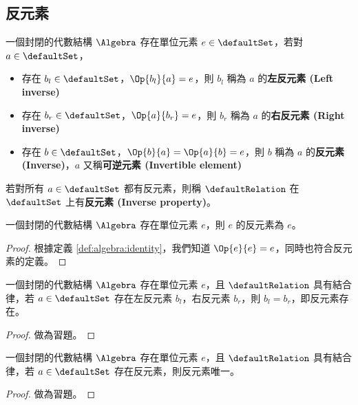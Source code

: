 \documentclass[12pt,a4paper,oneside]{report}
\begin{document}
\begin{CJK}{UTF8}{bkai}
\subsection{反元素}

\begin{mydef}[反元素]
\label{def:algebra:inverse}
一個封閉的代數結構 $\Algebra$ 存在單位元素 $e\in{\defaultSet}$，若對 $a\in{\defaultSet}$，
\begin{itemize}
\item 存在 $b_l\in{\defaultSet}$，$\Op{b_l}{a}=e$，則 $b_l$ 稱為 $a$ 的\textbf{左反元素 (Left inverse)}
\item 存在 $b_r\in{\defaultSet}$，$\Op{a}{b_r}=e$，則 $b_r$ 稱為 $a$ 的\textbf{右反元素 (Right inverse)}
\item 存在 $b\in{\defaultSet}$，$\Op{b}{a}=\Op{a}{b}=e$，則 $b$ 稱為 $a$ 的\textbf{反元素 (Inverse)}，$a$ 又稱\textbf{可逆元素 (Invertible element)}
\end{itemize}
若對所有 $a\in{\defaultSet}$ 都有反元素，則稱 $\defaultRelation$ 在 $\defaultSet$ 上有\textbf{反元素 (Inverse property)}。
\end{mydef}

\begin{mypropo}
\label{pro:algebra:identity_has_inverse}
一個封閉的代數結構 $\Algebra$ 存在單位元素 $e$，則 $e$ 的反元素為 $e$。
\end{mypropo}
\begin{proof}
根據定義 \ref{def:algebra:identity}，我們知道 $\Op{e}{e}=e$，同時也符合反元素的定義。
\end{proof}

\begin{mythm}[反元素存在性]
\label{thm:algebra:inverse_existence}
一個封閉的代數結構 $\Algebra$ 存在單位元素 $e$，且 $\defaultRelation$ 具有結合律，若 $a\in{\defaultSet}$ 存在左反元素 $b_l$，右反元素 $b_r$，則 $b_l=b_r$，即反元素存在。
\end{mythm}
\begin{proof}
做為習題。
\end{proof}

\begin{mythm}[反元素唯一性]
\label{thm:algebra:inverse_uniqueness}
一個封閉的代數結構 $\Algebra$ 存在單位元素 $e$，且 $\defaultRelation$ 具有結合律，若 $a\in{\defaultSet}$ 存在反元素，則反元素唯一。
\end{mythm}
\begin{proof}
做為習題。
\end{proof}


\end{CJK}
\end{document}
